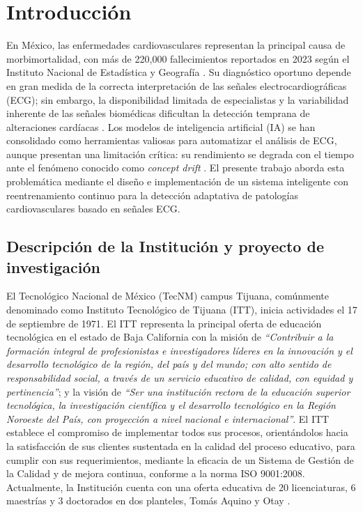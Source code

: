 
 

\chapter{Introducción}

En México, las enfermedades cardiovasculares representan la principal causa de morbimortalidad, con más de 220,000 fallecimientos reportados en 2023 según el Instituto Nacional de Estadística y Geografía \cite{INEGI2024}. Su diagnóstico oportuno depende en gran medida de la correcta interpretación de las señales electrocardiográficas (ECG); sin embargo, la disponibilidad limitada de especialistas y la variabilidad inherente de las señales biomédicas dificultan la detección temprana de alteraciones cardíacas \cite{WHO2024}. Los modelos de inteligencia artificial (IA) se han consolidado como herramientas valiosas para automatizar el análisis de ECG, aunque presentan una limitación crítica: su rendimiento se degrada con el tiempo ante el fenómeno conocido como \textit{concept drift} \cite{Reshad2025}. El presente trabajo aborda esta problemática mediante el diseño e implementación de un sistema inteligente con reentrenamiento continuo para la detección adaptativa de patologías cardiovasculares basado en señales ECG.

\section{Descripción de la Institución y proyecto de investigación}

El Tecnológico Nacional de México (TecNM) campus Tijuana, comúnmente denominado como Instituto Tecnológico de Tijuana (ITT), inicia actividades el 17 de septiembre de 1971. El ITT representa la principal oferta de educación tecnológica en el estado de Baja California con la misión de \textit{``Contribuir a la formación integral de profesionistas e investigadores líderes en la innovación y el desarrollo tecnológico de la región, del país y del mundo; con alto sentido de responsabilidad social, a través de un servicio educativo de calidad, con equidad y pertinencia''}; y la visión de \textit{``Ser una institución rectora de la educación superior tecnológica, la investigación científica y el desarrollo tecnológico en la Región Noroeste del País, con proyección a nivel nacional e internacional''}. El ITT establece el compromiso de implementar todos sus procesos, orientándolos hacia la satisfacción de sus clientes sustentada en la calidad del proceso educativo, para cumplir con sus requerimientos, mediante la eficacia de un Sistema de Gestión de la Calidad y de mejora continua, conforme a la norma ISO 9001:2008. Actualmente, la Institución cuenta con una oferta educativa de 20 licenciaturas, 6 maestrías y 3 doctorados en dos planteles, Tomás Aquino y Otay \cite{ITT}.

